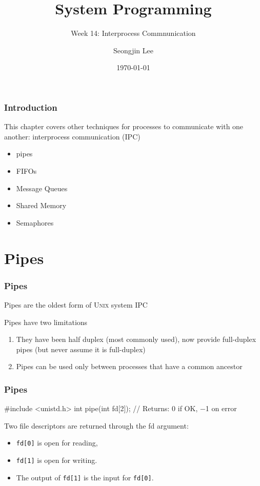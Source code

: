 \documentclass[newPxFont,sthlmFooter,nooffset]{beamer}
\title{System Programming}
\subtitle{Week 14: Interprocess Commnunication}
\author[SJL]{Seongjin Lee}
\institute{\href{mailto:insight@gnu.ac.kr}{insight@gnu.ac.kr}\\\url{http://open.gnu.ac.kr}\\Systems Research Lab.\\Gyeongsang National University}
\date{\today}
\begin{document}
\frame[plain]{\titlepage}






\begin{frame}[t]
  \frametitle{Introduction}



This chapter covers other techniques for processes to communicate with one another: interprocess communication (IPC)
\begin{itemize}
\item pipes
\item FIFOs
\item Message Queues
\item Shared Memory
\item Semaphores
\end{itemize}
\end{frame}

\section{Pipes}

\begin{frame}[t, fragile]
  \frametitle{Pipes}
Pipes are the oldest form of \textsc{Unix} system IPC

Pipes have two limitations
\begin{enumerate}
\item They have been half duplex (most commonly used), now provide full-duplex pipes (but never assume it is full-duplex)
\item Pipes can be used only between processes that have a common ancestor
\end{enumerate}

\end{frame}


\begin{frame}[t, fragile]
  \frametitle{Pipes}
\begin{codedef}
#include <unistd.h>
int pipe(int fd[2]);
// Returns: 0 if OK, −1 on error
\end{codedef}
Two file descriptors are returned through the fd argument:
\begin{itemize}
\item \texttt{fd[0]} is open for reading,
\item \texttt{fd[1]} is open for writing.
\item The output of \texttt{fd[1]} is the input for \texttt{fd[0]}.
\end{itemize}

\end{frame}
\end{document}
